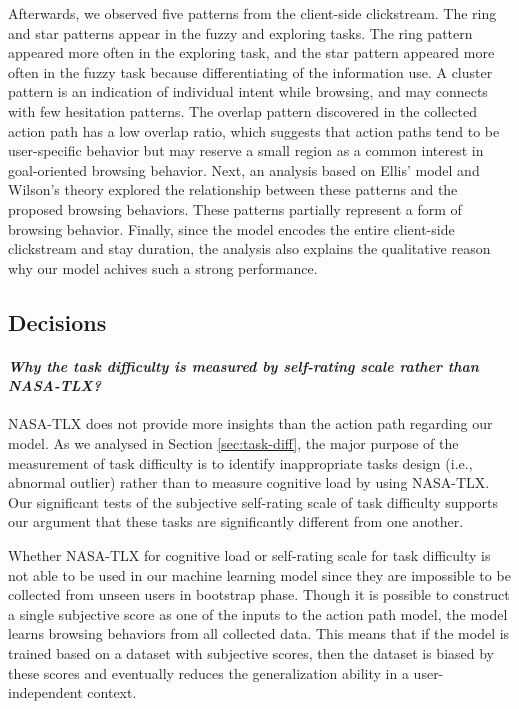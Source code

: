 Afterwards, we observed five patterns from the client-side clickstream. 
The ring and star patterns appear in the fuzzy and exploring tasks. 
The ring pattern appeared more often in the exploring task,
and the star pattern appeared more often in the fuzzy task 
because differentiating of the information use.
A cluster pattern is an indication of individual intent while browsing, and may connects
with few hesitation patterns.
The overlap pattern discovered in the collected action path has a low overlap ratio,
which suggests that action paths tend to be user-specific behavior but may reserve a small region as
a common interest in goal-oriented browsing behavior.
Next, an analysis based on Ellis' model and Wilson's theory explored the relationship 
between these patterns and the proposed browsing behaviors. These patterns partially represent a form of browsing behavior.
Finally, since the model encodes the entire client-side clickstream and stay duration,
the analysis also explains the qualitative reason why our model achives such a strong performance.

\subsection{Decisions}
\label{sec:decision}

\paragraph{\emph{Why the task difficulty is measured by self-rating scale rather than NASA-TLX?}}

NASA-TLX does not provide more insights than the action path regarding our model.
As we analysed in Section \ref{sec:task-diff}, the major purpose of the measurement of 
task difficulty is to identify inappropriate tasks design (i.e., abnormal outlier) 
rather than to measure cognitive load by using NASA-TLX.
Our significant tests of the subjective self-rating scale of task difficulty supports
our argument that these tasks are significantly different from one another.

Whether NASA-TLX for cognitive load or self-rating scale for task difficulty is not able to be used in
our machine learning model since they are impossible to be collected from unseen users in bootstrap phase.
Though it is possible to construct a single subjective score as one of the inputs to the action path model,
the model learns browsing behaviors from all collected data. This means that if the model is trained based on 
a dataset with subjective scores, then the dataset is biased by these scores and eventually reduces the 
generalization ability in a user-independent context.

